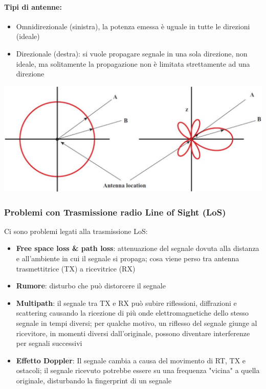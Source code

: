 \paragraph{Tipi di antenne:}
\begin{itemize}
	\item Omnidirezionale (sinistra), la potenza emessa è uguale in tutte le direzioni (ideale)

	\item Direzionale (destra): si vuole propagare segnale in una sola direzione, non ideale, ma solitamente la propagazione non è limitata strettamente ad una direzione
\end{itemize}
\begin{center}
	\includegraphics[width=0.7\linewidth]{img/wireless/antenna}
\end{center}

\subsubsection{Problemi con Trasmissione radio Line of Sight (LoS)}

Ci sono problemi legati alla trasmissione LoS:
\begin{itemize}
	\item \textbf{Free space loss \& path loss}: attenuazione del segnale dovuta alla distanza e all'ambiente in cui il segnale si propaga; cosa viene perso tra antenna trasmettitrice (TX) a ricevitrice (RX)
	
    \item \textbf{Rumore}: disturbo che può distorcere il segnale
	
    \item \textbf{Multipath}: il segnale tra TX e RX può subire riflessioni, diffrazioni e scattering causando la ricezione di più onde elettromagnetiche dello stesso segnale in tempi diversi; per qualche motivo, un riflesso del segnale giunge al ricevitore, in momenti diversi dall'originale, possono diventare interferenze per segnali successivi
	
    \item \textbf{Effetto Doppler}: Il segnale cambia a causa del movimento di RT, TX e ostacoli; il segnale ricevuto potrebbe essere su una frequenza "vicina" a quella originale, disturbando la fingerprint di un segnale
\end{itemize}


